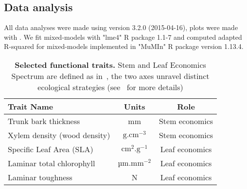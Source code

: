 \subsection*{Data analysis}

All data analyses were made using \citet{R_language} version 3.2.0 (2015-04-16), plots were made with \citet{ggplot2_pkg}. We fit mixed-models with "lme4" R package \citep{lme4_pkg} 1.1-7 and computed adapted R-squared for mixed-models \citep{nakagawa_general_2013} implemented in "MuMIn" R package \citep{mumin_pkg} version 1.13.4.

\begin{table}
	\begin{center}
		\begin{tabular}{lcc}
		\hline \hline
		Trait Name & Units & Role \\
		\hline
		Trunk bark thickness & mm & Stem economics \\
		Xylem density (wood density) & $\text{g}.\text{cm}^{-3}$ & Stem economics \\
		Specific Leaf Area (SLA) & $\text{cm}^2.\text{g}^{-1}$ & Leaf economics \\
		Laminar total chlorophyll & $\text{µm}.\text{mm}^{-2}$  & Leaf economics \\
		Laminar toughness & N & Leaf economics \\
		\hline \hline
		\end{tabular}
		\caption{\textbf{Selected functional traits.} Stem and Leaf Economics Spectrum are defined as in~\citep{baraloto_decoupled_2010}, the two axes unravel distinct ecological strategies (see~ for more details)} 
		\label{tab:seltraits}
	\end{center}
\end{table}
